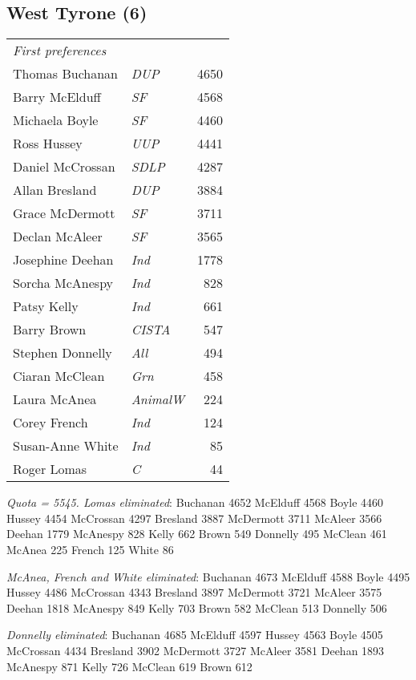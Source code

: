\begin{resultsiii}
\subsection*{West Tyrone (6)}


\noindent
\begin{tabular*}{\columnwidth}{@{\extracolsep{\fill}} p{} >{\itshape}l r @{\extracolsep{\fill}}}
	\emph{First preferences}\\
	Thomas Buchanan & DUP & 4650\\
	Barry McElduff & SF & 4568\\
	Michaela Boyle & SF & 4460\\
	Ross Hussey & UUP & 4441\\
	Daniel McCrossan & SDLP & 4287\\
	Allan Bresland & DUP & 3884\\
	Grace McDermott & SF & 3711\\
	Declan McAleer & SF & 3565\\
	Josephine Deehan & Ind & 1778\\
	Sorcha McAnespy & Ind & 828\\
	Patsy Kelly & Ind & 661\\
	Barry Brown & CISTA & 547\\
	Stephen Donnelly & All & 494\\
	Ciaran McClean & Grn & 458\\
	Laura McAnea & AnimalW & 224\\
	Corey French & Ind & 124\\
	Susan-Anne White & Ind & 85\\
	Roger Lomas & C & 44\\
\end{tabular*}

\emph{Quota = 5545.  Lomas eliminated}: Buchanan 4652 McElduff 4568 Boyle 4460 Hussey 4454 McCrossan 4297 Bresland 3887 McDermott 3711 McAleer 3566 Deehan 1779 McAnespy 828 Kelly 662 Brown 549 Donnelly 495 McClean 461 McAnea 225 French 125 White 86

\emph{McAnea, French and White eliminated}: Buchanan 4673 McElduff 4588 Boyle 4495 Hussey 4486 McCrossan 4343 Bresland 3897 McDermott 3721 McAleer 3575 Deehan 1818 McAnespy 849 Kelly 703 Brown 582 McClean 513 Donnelly 506 

\emph{Donnelly eliminated}: Buchanan 4685 McElduff 4597 Hussey 4563 Boyle 4505 McCrossan 4434 Bresland 3902 McDermott 3727 McAleer 3581 Deehan 1893 McAnespy 871 Kelly 726 McClean 619 Brown 612 


\end{resultsiii}
